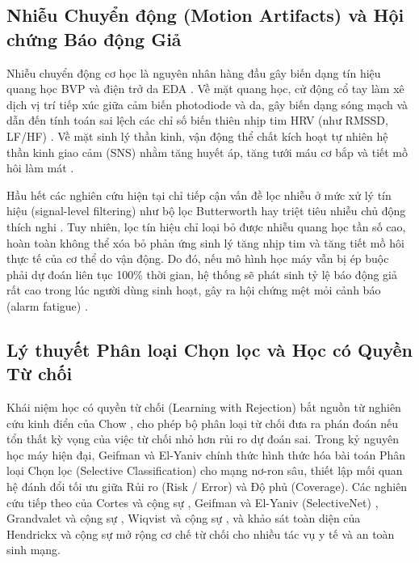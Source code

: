 \documentclass[conference]{IEEEtran}
\begin{document}
\subsection{Nhiễu Chuyển động (Motion Artifacts) và Hội chứng Báo động Giả}
Nhiễu chuyển động cơ học là nguyên nhân hàng đầu gây biến dạng tín hiệu quang học BVP và điện trở da EDA \cite{zhang2014troika, schumm2010effect, tamura2014wearable}. Về mặt quang học, cử động cổ tay làm xê dịch vị trí tiếp xúc giữa cảm biến photodiode và da, gây biến dạng sóng mạch và dẫn đến tính toán sai lệch các chỉ số biến thiên nhịp tim HRV (như RMSSD, LF/HF) \cite{zhang2014troika}. Về mặt sinh lý thần kinh, vận động thể chất kích hoạt tự nhiên hệ thần kinh giao cảm (SNS) nhằm tăng huyết áp, tăng tưới máu cơ bắp và tiết mồ hôi làm mát \cite{boucsein2012electrodermal, schumm2010effect}. 

Hầu hết các nghiên cứu hiện tại chỉ tiếp cận vấn đề lọc nhiễu ở mức xử lý tín hiệu (signal-level filtering) như bộ lọc Butterworth hay triệt tiêu nhiễu chủ động thích nghi \cite{zhang2014troika}. Tuy nhiên, lọc tín hiệu chỉ loại bỏ được nhiễu quang học tần số cao, hoàn toàn không thể xóa bỏ phản ứng sinh lý tăng nhịp tim và tăng tiết mồ hôi thực tế của cơ thể do vận động. Do đó, nếu mô hình học máy vẫn bị ép buộc phải dự đoán liên tục 100\% thời gian, hệ thống sẽ phát sinh tỷ lệ báo động giả rất cao trong lúc người dùng sinh hoạt, gây ra hội chứng mệt mỏi cảnh báo (alarm fatigue) \cite{can2019stress}.

\subsection{Lý thuyết Phân loại Chọn lọc và Học có Quyền Từ chối}
Khái niệm học có quyền từ chối (Learning with Rejection) bắt nguồn từ nghiên cứu kinh điển của Chow \cite{chow1970optimum}, cho phép bộ phân loại từ chối đưa ra phán đoán nếu tổn thất kỳ vọng của việc từ chối nhỏ hơn rủi ro dự đoán sai. Trong kỷ nguyên học máy hiện đại, Geifman và El-Yaniv \cite{geifman2017selective} chính thức hình thức hóa bài toán Phân loại Chọn lọc (Selective Classification) cho mạng nơ-ron sâu, thiết lập mối quan hệ đánh đổi tối ưu giữa Rủi ro (Risk / Error) và Độ phủ (Coverage). Các nghiên cứu tiếp theo của Cortes và cộng sự \cite{cortes2016learning}, Geifman và El-Yaniv (SelectiveNet) \cite{geifman2019selectivenet}, Grandvalet và cộng sự \cite{grandvalet2002adaptive}, Wiqvist và cộng sự \cite{wiqvist2022partially}, và khảo sát toàn diện của Hendrickx và cộng sự \cite{hendrickx2021machine} mở rộng cơ chế từ chối cho nhiều tác vụ y tế và an toàn sinh mạng.
\end{document}
